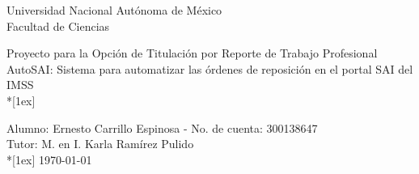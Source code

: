 \documentclass[letterpaper,11pt]{report}
\begin{document}
\begin{center}
\begin{Large}
Universidad Nacional Autónoma de México\\
Facultad de Ciencias\\
\end{Large}
\begin{LARGE}
Proyecto para la Opción de Titulación por Reporte de Trabajo Profesional\\
AutoSAI: Sistema para automatizar las órdenes de reposición en el portal SAI del IMSS\\*[1ex]
\end{LARGE}

Alumno: Ernesto Carrillo Espinosa - No. de cuenta: 300138647\\
Tutor: M. en I. Karla Ramírez Pulido\\*[1ex]
\today
\end{center}

\clearpage
{}

\tableofcontents
\listoffigures





\nocite{*} 
% 


\end{document}
